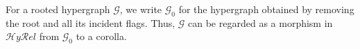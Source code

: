 \documentclass{article}
\theoremstyle{definition}
\theoremstyle{remark}
\def\G{\mathcal{G}}
\def\H{\mathcal{H}}
\def\Set{\mathbf{Set}}
\def\hyrel{\mathcal{H}\mathit{y}\mathcal{R}\mathit{el}}
\begin{document}
\begin{comment}
 actually lands in $\Set$ and is defined as follows:
\begin{align*}
  M_1(\G',(\G,\H_v)) &= \text{weak equivalences $\G'\to \H_v$ for some $v$}\\
  M_1(\star,(\G,\H_v)) &= \text{edges of $\G$}\\
  M_1(\G',\star) &= \emptyset\\
  M_1(\star,\star) &= 1\\
\end{align*}
We claim that the composite profunctor $H_1 \otimes_{K_1} M_1$ is then given by
\begin{align*}
  H_1 \otimes_{K_1} M_1(\bullet,(\G,\H_v)) &= \text{edges of $\H_v$ for some $v$}\\
  H_1 \otimes_{K_1} M_1([n],(\G,\H_v)) &= \text{non-root vertices in $\H_v$ for some $v$ with rank $n$}\\
  H_1 \otimes_{K_1} M_1(\bullet,\star) &= 1\\
  H_1 \otimes_{K_1} M_1([n],\star) &= \emptyset
\end{align*}
For $([n],(\G,\H_v))$ this follows from the co-Yoneda lemma combining $H_1([n],\G')$ with $M_1(\G',(\G,\H_v))$, and the fact that $H_1([n],\star)=\emptyset$ so there is no contribution from $M_1(\star,(\G,\H_v))$.
The trivial cases are straightforward.
And for $(\bullet,(\G,\H_v))$, from $H_1(\bullet,\G')$ and $M_1(\G',(\G,\H_v))$ we get (by the co-Yoneda lemma again) a contribution of the edges of $\H_v$ for all $v$, while from $H_1(\bullet,\star)$ and $M_1(\star,(\G,\H_v))$ we get a contribution of $1$
\end{comment}

For a rooted hypergraph $\G$, we write $\G_0$ for the hypergraph obtained by removing the root and all its incident flags.
Thus, $\G$ can be regarded as a morphism in $\hyrel$ from $\G_0$ to a corolla.
\end{document}
